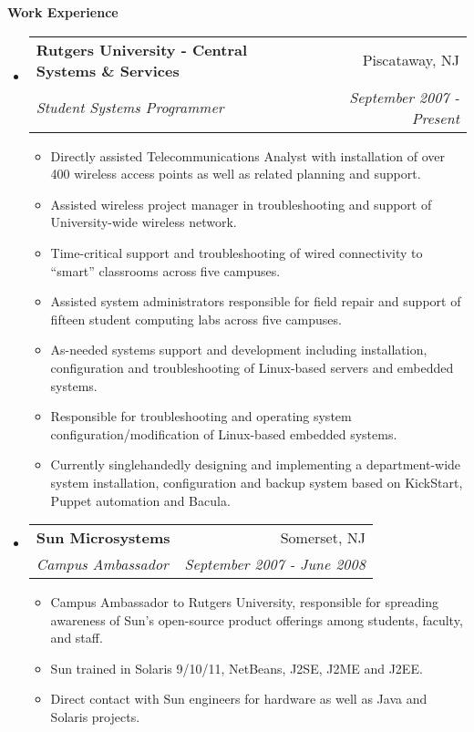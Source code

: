 \documentclass[letterpaper,11pt]{article}
\makeatletter
\newcommand{\resitem}[1]{\item #1 \vspace{-2pt}}
\newcommand{\resheading}[1]{{\large \colorbox{mygrey}{\begin{minipage}{\textwidth}{\textbf{#1 \vphantom{p\^{E}}}}\end{minipage}}}}
\newcommand{\ressubheading}[4]{
\begin{tabular*}{7.0in}{l@{\extracolsep{\fill}}r}
		\textbf{#1} & #2 \\
		\textit{#3} & \textit{#4} \\
\end{tabular*}\vspace{-6pt}}
\makeatother
\begin{document}
\resheading{Work Experience}
\begin{itemize}
\item
	\ressubheading{Rutgers University - Central Systems \& Services}{Piscataway, NJ}{Student Systems Programmer}{September 2007 - Present}
	\begin{itemize}
                \resitem{Directly assisted Telecommunications Analyst with
                  installation of over 400 wireless access
                  points as well as related planning and support.}
                \resitem{Assisted wireless project manager in troubleshooting
                  and support of University-wide wireless network.}
                \resitem{Time-critical support and troubleshooting of wired
                  connectivity to ``smart'' classrooms across five campuses.}
                \resitem{Assisted system administrators responsible for field repair and support of fifteen student computing
                  labs across five campuses.}
                \resitem{As-needed systems support and development including
                  installation, configuration and troubleshooting of 
                  Linux-based servers and embedded systems.}
                \resitem{Responsible for troubleshooting and operating system
                  configuration/modification of Linux-based embedded systems.}
                \resitem{Currently singlehandedly designing and implementing a department-wide system
                  installation, configuration and backup system based on
                  KickStart, Puppet automation and Bacula.}
	\end{itemize}

\item
        \ressubheading{Sun Microsystems}{Somerset, NJ}{Campus Ambassador}{September 2007 - June 2008}
        \begin{itemize}
                \resitem{Campus Ambassador to Rutgers University, responsible
                  for spreading awareness of Sun's open-source product
                  offerings among students, faculty, and staff.}
                \resitem{Sun trained in Solaris 9/10/11,
                  NetBeans, J2SE, J2ME and J2EE. }
                \resitem{Direct contact with Sun engineers for hardware as
                  well as Java and Solaris projects.}
        \end{itemize}


\end{itemize}
\end{document}
